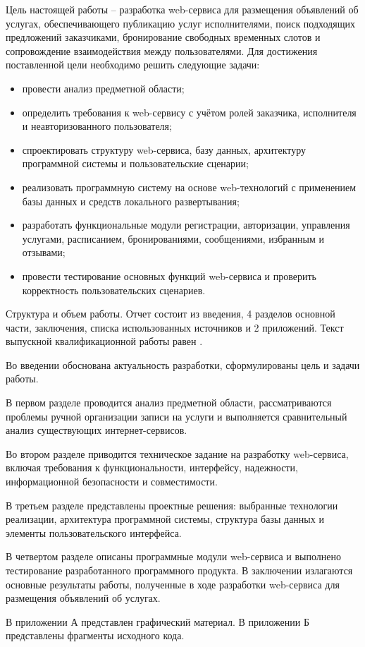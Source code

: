 Цель настоящей работы -- разработка web-сервиса для размещения объявлений об услугах, обеспечивающего публикацию услуг исполнителями, поиск подходящих предложений заказчиками, бронирование свободных временных слотов и сопровождение взаимодействия между пользователями. Для достижения поставленной цели необходимо решить следующие задачи:
\begin{itemize}
	\item провести анализ предметной области;
	\item определить требования к web-сервису с учётом ролей заказчика, исполнителя и неавторизованного пользователя;
	\item спроектировать структуру web-сервиса, базу данных, архитектуру программной системы и пользовательские сценарии;
	\item реализовать программную систему на основе web-технологий с применением базы данных и средств локального развертывания;
	\item разработать функциональные модули регистрации, авторизации, управления услугами, расписанием, бронированиями, сообщениями, избранным и отзывами;
	\item провести тестирование основных функций web-сервиса и проверить корректность пользовательских сценариев.
\end{itemize}

Структура и объем работы. Отчет состоит из введения, 4 разделов основной части, заключения, списка использованных источников и 2 приложений. Текст выпускной квалификационной работы равен .

Во введении обоснована актуальность разработки, сформулированы цель и задачи работы. 

В первом разделе проводится анализ предметной области, рассматриваются проблемы ручной организации записи на услуги и выполняется сравнительный анализ существующих интернет-сервисов. 

Во втором разделе приводится техническое задание на разработку web-сервиса, включая требования к функциональности, интерфейсу, надежности, информационной безопасности и совместимости. 

В третьем разделе представлены проектные решения: выбранные технологии реализации, архитектура программной системы, структура базы данных и элементы пользовательского интерфейса. 

В четвертом разделе описаны программные модули web-сервиса и выполнено тестирование разработанного программного продукта.
В заключении излагаются основные результаты работы, полученные в ходе разработки web-сервиса для размещения объявлений об услугах.

В приложении А представлен графический материал.
В приложении Б представлены фрагменты исходного кода.